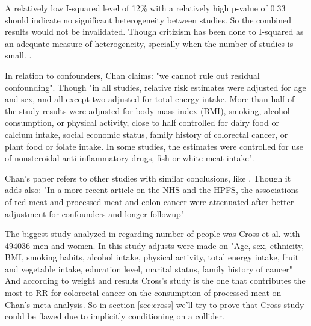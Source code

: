 \documentclass{article}
\begin{document}
A relatively low I-squared level of 12\% with a relatively high p-value of 0.33 should indicate no significant heterogeneity between studies. So the combined results would not be invalidated. Though critizism has been done to I-squared as an adequate measure of heterogeneity, specially when the number of studies is small. \cite{hippel}.

In relation to confounders, Chan claims: "we cannot rule out residual confounding". Though "in all studies, relative risk estimates were adjusted for age and sex, and all except two adjusted for total energy intake. More than
half of the study results were adjusted for body mass index (BMI), smoking, alcohol consumption, or physical activity, close to half controlled for dairy food or calcium intake, social economic status,
family history of colorectal cancer, or plant food or folate intake.
In some studies, the estimates were controlled for use of nonsteroidal
anti-inflammatory drugs, fish or white meat intake". %

Chan's paper refers to other studies with similar conclusions, like \cite{aicr,wei2009}.
Though it adds also: "In a more recent article on the NHS and the HPFS, the
associations of red meat and processed meat and colon cancer were
attenuated after better adjustment for confounders and longer followup" \cite{wei}

The biggest study analyzed in \cite{chan} regarding number of people was Cross et al. \cite{cross} with 494036 men and women. In this study adjusts were made on "Age, sex, ethnicity, BMI, smoking habits, alcohol intake, physical activity, total energy intake, fruit and vegetable intake, education level, marital status, family history of cancer"
And according to weight and results Cross's study is the one that contributes the most to RR for colorectal cancer on the consumption of processed meat on Chan's meta-analysis. So in section \ref{sec:cross} we'll try to prove that Cross study could be flawed due to implicitly conditioning on a collider.
\end{document}

